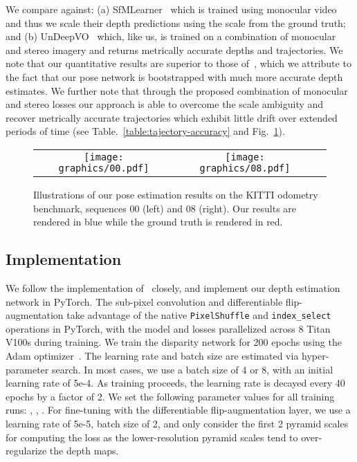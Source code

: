 \documentclass[letterpaper, 10 pt, conference]{ieeeconf}  \IEEEoverridecommandlockouts
\begin{document}
 
We compare against: (a) SfMLearner~\cite{zhou2017unsupervised} which is trained using monocular video and thus we scale their depth predictions using the scale from the ground truth; and (b) UnDeepVO~\cite{li2017undeepvo} which, like us, is trained on a combination of monocular and stereo imagery and returns metrically accurate depths and trajectories. We note that our quantitative results are superior to those of~\cite{li2017undeepvo}, which we attribute to the fact that our pose network is bootstrapped with much more accurate depth estimates. We further note that through the proposed combination of monocular and stereo losses our approach is able to overcome the scale ambiguity and recover metrically accurate trajectories which exhibit little drift over extended periods of time (see Table.~\ref{table:tajectory-accuracy} and Fig.~\ref{fig:trajectory-illustration}).



\begin{figure}[t]
  \centering
  {\renewcommand{\arraystretch}{0.4} {\setlength{\tabcolsep}{0.2mm}
    \begin{tabular}{ccc}
    \texttt{[image: graphics/00.pdf]}&
    \texttt{[image: graphics/08.pdf]}&
\end{tabular}}}
  \caption{Illustrations of our pose estimation results on the KITTI odometry benchmark, sequences 00 (left) and 08 (right). Our results are rendered in blue while the ground truth is rendered in red.}
  \label{fig:trajectory-illustration}
\end{figure}





\subsection{Implementation}
We follow the implementation of~\cite{godard2017unsupervised} closely, and implement our depth estimation network in PyTorch. The sub-pixel convolution and differentiable flip-augmentation take advantage of the native \texttt{PixelShuffle} and \texttt{index\_select} operations in PyTorch, with the model and losses parallelized across 8 Titan V100s during training. We train the disparity network for 200 epochs using the Adam optimizer~\cite{kingma2014adam}. The learning rate and batch size are estimated via hyper-parameter search. In most cases, we use a batch size of 4 or 8, with an initial learning rate of 5e-4. As training proceeds, the learning rate is decayed every 40 epochs by a factor of 2. We set the following parameter values for all training runs: , , . For fine-tuning with the differentiable flip-augmentation layer, we use a learning rate of 5e-5, batch size of 2, and only consider the first 2 pyramid scales for computing the loss as the lower-resolution pyramid scales tend to over-regularize the depth maps.  
\end{document}

